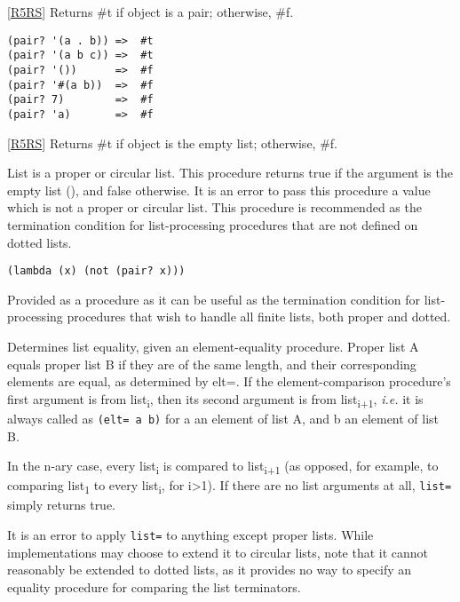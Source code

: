 \begin{description}
\href{}{}
\item[\texttt{pair?} object -\textgreater{} boolean ]
{[}\protect\hyperlink{R5RS}{R5RS}{]} Returns \#t if object is a pair;
otherwise, \#f.

\begin{verbatim}
(pair? '(a . b)) =>  #t
(pair? '(a b c)) =>  #t
(pair? '())      =>  #f
(pair? '#(a b))  =>  #f
(pair? 7)        =>  #f
(pair? 'a)       =>  #f
\end{verbatim}

\href{}{}
\item[\texttt{null?} object -\textgreater{} boolean ]
{[}\protect\hyperlink{R5RS}{R5RS}{]} Returns \#t if object is the empty
list; otherwise, \#f. \href{}{}
\item[\texttt{null-list?} list -\textgreater{} boolean ]
List is a proper or circular list. This procedure returns true if the
argument is the empty list (), and false otherwise. It is an error to
pass this procedure a value which is not a proper or circular list. This
procedure is recommended as the termination condition for
list-processing procedures that are not defined on dotted lists.
\item[ \href{}{} \texttt{not-pair?} x -\textgreater{} boolean ]
\begin{verbatim}
(lambda (x) (not (pair? x)))
\end{verbatim}

Provided as a procedure as it can be useful as the termination condition
for list-processing procedures that wish to handle all finite lists,
both proper and dotted.
\item[ \href{}{} \texttt{list=} elt= list\textsubscript{1} \ldots{}
-\textgreater{} boolean ]
Determines list equality, given an element-equality procedure. Proper
list A equals proper list B if they are of the same length, and their
corresponding elements are equal, as determined by elt=. If the
element-comparison procedure's first argument is from
list\textsubscript{i}, then its second argument is from
list\textsubscript{i+1}, \emph{i.e.} it is always called as
\texttt{(elt=\ a\ b)} for a an element of list A, and b an element of
list B.

In the n-ary case, every list\textsubscript{i} is compared to
list\textsubscript{i+1} (as opposed, for example, to comparing
list\textsubscript{1} to every list\textsubscript{i}, for
i\textgreater{}1). If there are no list arguments at all, \texttt{list=}
simply returns true.

It is an error to apply \texttt{list=} to anything except proper lists.
While implementations may choose to extend it to circular lists, note
that it cannot reasonably be extended to dotted lists, as it provides no
way to specify an equality procedure for comparing the list terminators.


\end{description}
